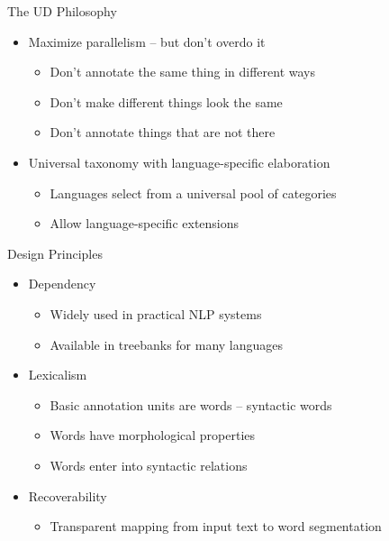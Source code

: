 \documentclass[10pt, compress, aspectratio=169]{beamer}
\begin{document}
\begin{frame}{The UD Philosophy}
\begin{itemize}
\item  Maximize parallelism – but don’t overdo it
\begin{itemize}
\item Don’t annotate the same thing in different ways
\item Don’t make different things look the same
\item Don’t annotate things that are not there
\end{itemize}
\item Universal taxonomy with language-specific elaboration
\begin{itemize}
\item Languages select from a universal pool of categories
\item Allow language-specific extensions
\end{itemize}
\end{itemize}
\end{frame}

\begin{frame}{Design Principles}
\begin{itemize}
\item  Dependency
\begin{itemize}
\item Widely used in practical NLP systems
\item Available in treebanks for many languages
\end{itemize}
\item  Lexicalism
\begin{itemize}
\item Basic annotation units are words -- syntactic words
\item Words have morphological properties
\item Words enter into syntactic relations
\end{itemize}
\item  Recoverability
\begin{itemize}
\item Transparent mapping from input text to word segmentation
\end{itemize}
\end{itemize}
\end{frame}
\end{document}

